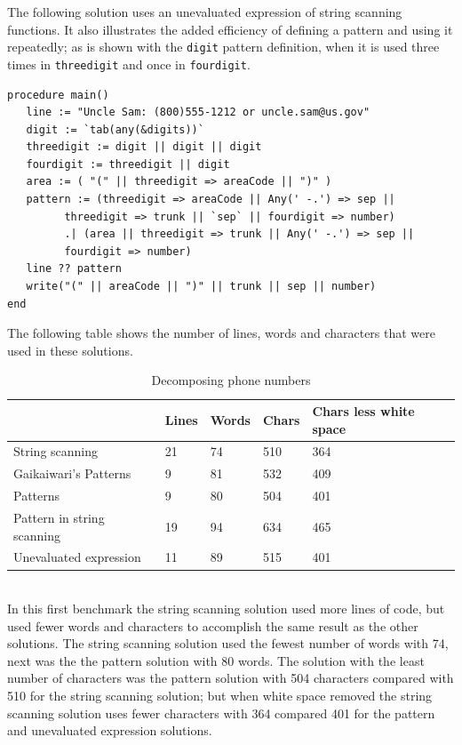 \documentclass{article}
\begin{document}
The following solution uses an unevaluated expression of string scanning functions.  It also illustrates the added efficiency of defining a pattern and using it repeatedly; as is shown with the \texttt{digit} pattern definition, when it is used three times in \texttt{threedigit} and once in \texttt{fourdigit}. 
\begin{verbatim}
procedure main()
   line := "Uncle Sam: (800)555-1212 or uncle.sam@us.gov"
   digit := `tab(any(&digits))`
   threedigit := digit || digit || digit
   fourdigit := threedigit || digit
   area := ( "(" || threedigit => areaCode || ")" )
   pattern := (threedigit => areaCode || Any(' -.') => sep ||
         threedigit => trunk || `sep` || fourdigit => number) 
         .| (area || threedigit => trunk || Any(' -.') => sep ||
         fourdigit => number)
   line ?? pattern
   write("(" || areaCode || ")" || trunk || sep || number) 
end
\end{verbatim}

The following table shows the number of lines, words and characters that were used in these solutions.\\
\begin{table}[ht]
	\caption{Decomposing phone numbers}
	\centering
	\begin{tabular}{|l|l|l|l|l|}
		\hline\hline
		 & Lines & Words & Chars & Chars less white space\\
		\hline
		String scanning & 21 & 74 & 510 & 364 \\
		Gaikaiwari's Patterns & 9 & 81 & 532 & 409 \\
		Patterns & 9 & 80 & 504 & 401 \\
		Pattern in string scanning & 19 & 94 & 634 & 465 \\
		Unevaluated expression & 11 & 89 & 515 & 401 \\
		\hline
	\end{tabular}
\end{table}\\

\pagebreak
In this first benchmark the string scanning solution used more lines of code, but used fewer words and characters to accomplish the same result as the other solutions.  The string scanning solution used the fewest number of words with 74, next was the the pattern solution with 80 words.  The solution with the least number of characters was the pattern solution with 504 characters compared with 510 for the string scanning solution; but when white space removed the string scanning solution uses fewer characters with 364 compared 401 for the pattern and unevaluated expression solutions.  
\end{document}
